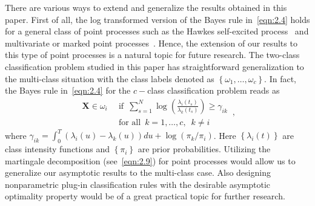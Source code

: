 \documentclass[lettersize,journal,onecolumn]{IEEEtran}
\theoremstyle{definition}
\begin{document}
\noindent There are various ways to extend and generalize the results obtained in this 
paper. First of all, the log transformed version of the Bayes rule in~\eqref{eqn:2.4} 
holds for a general class of point processes such as the Hawkes self-excited 
process~\cite{lima023} and multivariate or marked point 
processes~\cite{daley2003introduction}. Hence, the extension of our results to this
type of
point processes is a natural topic for future research. 
The two-class classification problem studied in this paper has straightforward
generalization to the multi-class situation with the class labels denoted as \mbox{$
	\left\{\omega_{1}, \ldots, \omega_{c}\right\}
	$}. In fact, the Bayes rule in~\eqref{eqn:2.4} for the $c-$class 
classification problem reads as
\begin{equation*}
	\begin{split}
		\mathbf{X}\in\omega_{i}
		\enspace & \text{if}
		\enspace
		\sum_{s=1}^{N} \log\left(\frac{\lambda_{i}(t_s)}{\lambda_{k}(t_s)}\right) 
		\geq \gamma_{ik} \\
		& \text{for all}
		\enspace k=1, \ldots, c,
		\enspace k \neq i
	\end{split}
	\,,
\end{equation*}
where \mbox{$
	\gamma_{ik}=\int_{0}^{T}\left(
	\lambda_{i}(u)-\lambda_{k}(u)
	\right)du + \log\left(\pi_{k}/\pi_{i}\right)
	$}. Here $\left\{\lambda_{i}(t)\right\}$ are class intensity functions and 
$\left\{\pi_{i}\right\}$ are prior probabilities. 
Utilizing the martingale decomposition (see~\eqref{eqn:2.9}) for point processes would 
allow us to generalize our asymptotic results to the multi-class case. Also designing 
nonparametric plug-in classification rules with the desirable asymptotic optimality 
property would be of a great practical topic for further research.

\appendices

\section{}
\label{app:A}
\end{document}
